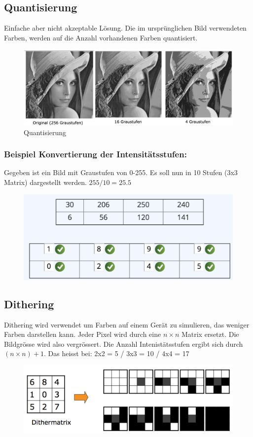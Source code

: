 \subsection{Quantisierung}
Einfache aber nicht akzeptable Lösung. Die im ursprünglichen Bild verwendeten Farben, werden auf die Anzahl vorhandenen Farben quantisiert. 
\begin{figure}[!ht]
\centering
\includegraphics[width=0.8\linewidth]{fig/quantisierung}
\caption{Quantisierung}
\label{fig:Quantisierung}
\end{figure}
\subsubsection{Beispiel Konvertierung der Intensitätsstufen:}
Gegeben ist ein Bild mit Graustufen von 0-255. Es soll nun in 10 Stufen (3x3 Matrix) dargestellt werden. \(255 / 10 = 25.5 \)
\begin{figure}[!ht]
\centering
\includegraphics[width=0.5\linewidth]{fig/quantisierung_bsp}
\label{fig:quantisierung_bsp}
\end{figure}



\subsection{Dithering} 
Dithering wird verwendet um Farben auf einem Gerät zu simulieren, das weniger Farben darstellen kann. Jeder Pixel wird durch eine \(n \times n\)  Matrix ersetzt. Die Bildgrösse wird also vergrössert. Die Anzahl Intenistätsstufen ergibt sich durch  \((n \times n) + 1 \). Das heisst bei: 2x2 = 5 / 3x3 = 10 / 4x4 = 17
\begin{figure}[!ht]
\centering
\includegraphics[width=0.7\linewidth]{fig/dithermatrix}
\label{fig:dithermatrix}
\end{figure}

